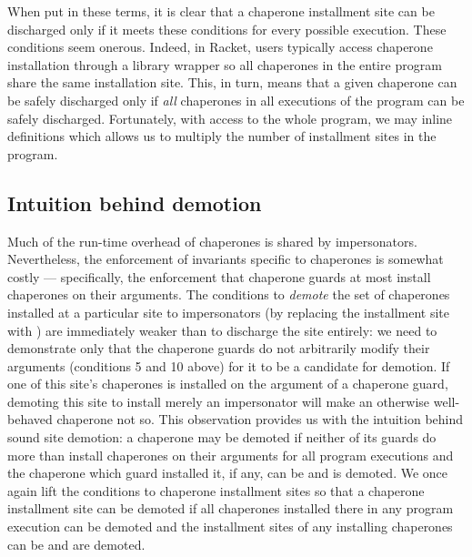 \documentclass{sigplanconf}
\begin{document}
When put in these terms, it is clear that a chaperone installment site can be discharged only if it meets these conditions for every possible execution.
These conditions seem onerous.
Indeed, in Racket, users typically access chaperone installation through a library wrapper so all chaperones in the entire program share the same installation site.
This, in turn, means that a given chaperone can be safely discharged only if \emph{all} chaperones in all executions of the program can be safely discharged.
Fortunately, with access to the whole program, we may inline definitions which allows us to multiply the number of installment sites in the program.


\subsection{Intuition behind demotion}

Much of the run-time overhead of chaperones is shared by impersonators.
Nevertheless, the enforcement of invariants specific to chaperones is somewhat costly --- specifically, the enforcement that chaperone guards at most install chaperones on their arguments.
The conditions to \emph{demote} the set of chaperones installed at a particular site to impersonators (by replacing the  installment site with ) are immediately weaker than to discharge the site entirely: we need to demonstrate only that the chaperone guards do not arbitrarily modify their arguments (conditions 5 and 10 above) for it to be a candidate for demotion.
If one of this site's chaperones is installed on the argument of a chaperone guard, demoting this site to install merely an impersonator will make an otherwise well-behaved chaperone not so.
This observation provides us with the intuition behind sound site demotion: a chaperone may be demoted if neither of its guards do more than install chaperones on their arguments for all program executions and the chaperone which guard installed it, if any, can be and is demoted. 
We once again lift the conditions to chaperone installment sites so that a chaperone installment site can be demoted if all chaperones installed there in any program execution can be demoted and the installment sites of any installing chaperones can be and are demoted.
\end{document}
